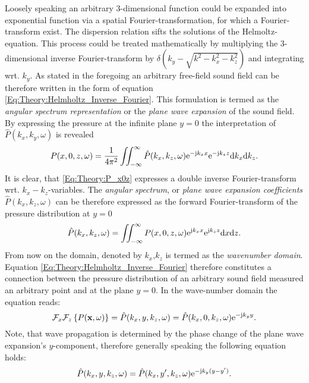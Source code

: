 Loosely speaking an arbitrary 3-dimensional function could be expanded into exponential function via a spatial Fourier-transformation, for which a Fourier-transform exist. The dispersion relation sifts the solutions of the Helmoltz-equation. This process could be treated mathematically by multiplying the 3-dimensional inverse Fourier-transform by $\delta(k_y - \sqrt{k^2-k_x^2-k_z^2})$ and integrating wrt. $k_y$.
As stated in the foregoing an arbitrary free-field sound field can be therefore written in the form of equation \eqref{Eq:Theory:Helmholtz_Inverse_Fourier}.
This formulation is termed as the \emph{angular spectrum representation} \cite{Ahrens2010phd, Ahrens2012, Williams1999} or the \emph{plane wave expansion} \cite{Spors2005} of the sound field.
By expressing the pressure at the infinite plane $y=0$ the interpretation of $\hat{P}(k_x,k_y, \omega)$ is revealed
\begin{equation}
P(x,0,z,\omega) = \frac{1}{4\pi^2}\iint_{-\infty}^{\infty} \hat{P}(k_x,k_z, \omega)  \mathrm{e}^{- \mathrm{j} k_x x} \mathrm{e}^{- \mathrm{j} k_z z  }
\mathrm{d} k_x\mathrm{d} k_z.
\label{Eq:Theory:P_x0z}
\end{equation}
It is clear, that \eqref{Eq:Theory:P_x0z} expresses a double inverse Fourier-transform wrt. $k_x-k_z$-variables. 
The \emph{angular spectrum}, or \emph{plane wave expansion coefficients} $\hat{P}(k_x,k_z, \omega)$ can be therefore expressed as the forward Fourier-transform of the pressure distribution at $y=0$
\begin{equation}
\hat{P}(k_x,k_z, \omega) = \iint_{-\infty}^{\infty} P(x,0,z,\omega)  \mathrm{e}^{ \mathrm{j} k_x x} \mathrm{e}^{ \mathrm{j} k_z z  }\mathrm{d} x \mathrm{d} z.
\end{equation}
From now on the domain, denoted by $k_x$,$k_z$ is termed as the \emph{wavenumber domain}.
Equation \eqref{Eq:Theory:Helmholtz_Inverse_Fourier} therefore constitutes a connection between the pressure distribution of an arbitrary sound field measured an arbitrary point and at the plane $y=0$. In the wave-number domain the equation reads:
\begin{equation}
\mathcal{F}_x\mathcal{F}_z \left\{ P(\mathbf{x},\omega) \right\} = \hat{P}(k_x,y,k_z,\omega) = \hat{P}(k_x,0,k_z,\omega) \mathrm{e}^{-\mathrm{j} k_y y}.
\label{Eq:Theory:Wave_field_extrapolation}
\end{equation}
Note, that wave propagation is determined by the phase change of the plane wave expansion's $y$-component, therefore generally speaking the following equation holds:
\begin{equation}
\hat{P}(k_x,y,k_z,\omega) = \hat{P}(k_x,y',k_z,\omega) \mathrm{e}^{-\mathrm{j} k_y ( y - y' ) }.
\end{equation}

